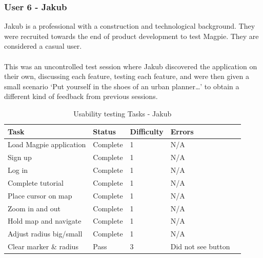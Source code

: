 \newpage
\subsubsection{User 6 - Jakub}
Jakub is a professional with a construction and technological background. They were recruited towards the end of product development to test Magpie. They are considered a casual user.\\ \\
This was an uncontrolled test session where Jakub discovered the application on their own, discussing each feature, testing each feature, and were then given a small scenario `Put yourself in the shoes of an urban planner\ldots' to obtain a different kind of feedback from previous sessions.\\
\begin{table}[h!]
    \centering
    \caption{Usability testing Tasks - Jakub}
    \begin{tabular}{|p{}|p{}|p{}|p{}|p{}|}
        \hline
        \textbf{Task}                 & \textbf{Status} & \textbf{Difficulty} & \textbf{Errors}    \\
        \hline
        Load Magpie application       & Complete        & 1                   & N/A                \\
        \hline
        Sign up                       & Complete        & 1                   & N/A                \\
        \hline
        Log in                        & Complete        & 1                   & N/A                \\
        \hline
        Complete tutorial             & Complete        & 1                   & N/A                \\
        \hline
        Place cursor on map           & Complete        & 1                   & N/A                \\
        \hline
        Zoom in and out               & Complete        & 1                   & N/A                \\
        \hline
        Hold map and navigate         & Complete        & 1                   & N/A                \\
        \hline
        Adjust radius big/small       & Complete        & 1                   & N/A                \\
        \hline
        Clear marker \& radius        & Pass            & 3                   & Did not see button \\

\end{tabular}
\end{table}
